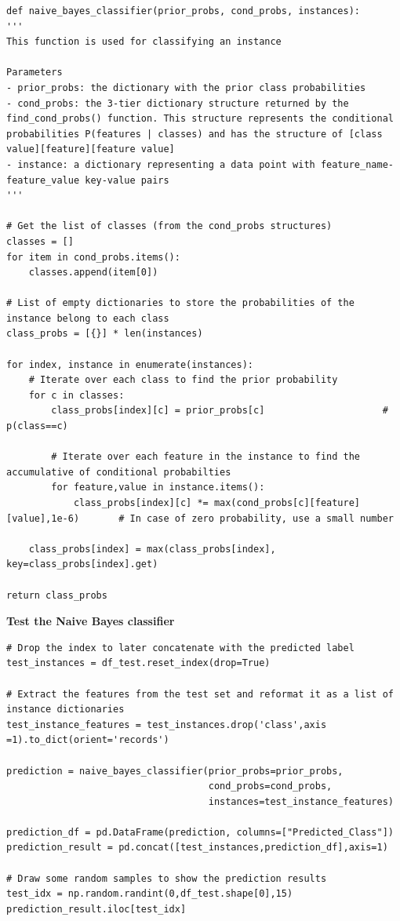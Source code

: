 \documentclass[a4paper]{article}
\begin{document}
\begin{lstlisting}
def naive_bayes_classifier(prior_probs, cond_probs, instances):
'''
This function is used for classifying an instance

Parameters
- prior_probs: the dictionary with the prior class probabilities
- cond_probs: the 3-tier dictionary structure returned by the find_cond_probs() function. This structure represents the conditional probabilities P(features | classes) and has the structure of [class value][feature][feature value]
- instance: a dictionary representing a data point with feature_name-feature_value key-value pairs
'''

# Get the list of classes (from the cond_probs structures)
classes = []
for item in cond_probs.items():
    classes.append(item[0]) 

# List of empty dictionaries to store the probabilities of the instance belong to each class
class_probs = [{}] * len(instances)                                      

for index, instance in enumerate(instances):
    # Iterate over each class to find the prior probability 
    for c in classes:
        class_probs[index][c] = prior_probs[c]                     # p(class==c)

        # Iterate over each feature in the instance to find the accumulative of conditional probabilties
        for feature,value in instance.items():
            class_probs[index][c] *= max(cond_probs[c][feature][value],1e-6)       # In case of zero probability, use a small number
    
    class_probs[index] = max(class_probs[index], key=class_probs[index].get)

return class_probs
\end{lstlisting}

\textbf{Test the Naive Bayes classifier}
\begin{lstlisting}
# Drop the index to later concatenate with the predicted label
test_instances = df_test.reset_index(drop=True)

# Extract the features from the test set and reformat it as a list of instance dictionaries
test_instance_features = test_instances.drop('class',axis =1).to_dict(orient='records')

prediction = naive_bayes_classifier(prior_probs=prior_probs,
                                    cond_probs=cond_probs,
                                    instances=test_instance_features)

prediction_df = pd.DataFrame(prediction, columns=["Predicted_Class"])
prediction_result = pd.concat([test_instances,prediction_df],axis=1)

# Draw some random samples to show the prediction results
test_idx = np.random.randint(0,df_test.shape[0],15)
prediction_result.iloc[test_idx]

\end{lstlisting}
\end{document}
